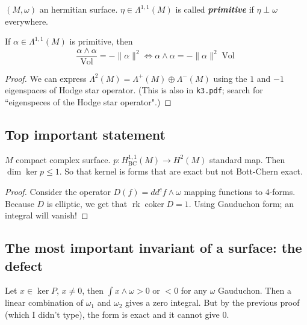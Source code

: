 \begin{defn}\leavevmode
\((M,\omega)\) an hermitian surface. \(\eta \in \Lambda^{1,1}(M)\) is called \textit{\textbf{primitive}} if \(\eta \perp \omega\) everywhere.
\end{defn}

\begin{thm}\leavevmode
If \(\alpha \in \Lambda^{1,1}(M)\) is primitive, then
 \[\frac{\alpha \wedge \alpha}{\operatorname{Vol}}=-\|\alpha\|^2 \iff \alpha \wedge \alpha=-\|\alpha\|^2\operatorname{Vol}\]
\end{thm}

\begin{proof}\leavevmode
We can express \(\Lambda^{2}(M)=\Lambda^{+}(M) \oplus \Lambda^{-}(M)\) using the \(1\) and \(-1\) eigenspaces of Hodge star operator. (This is also in \texttt{k3.pdf}; search for ``eigenspeces of the Hodge star operator".)
\end{proof}

\subsection{Top important statement}

\begin{thm}\leavevmode
\(M\) compact complex surface. \(p : H^{1,1}_{\operatorname{BC}}(M)\to H^{2}(M)\) standard map. Then \(\dim \ker p \leq 1\). So that kernel is forms that are exact but not Bott-Chern exact.
\end{thm}

\begin{proof}\leavevmode
	Consider the operator \(D(f)= d d^c f \wedge \omega\) mapping functions to 4-forms. Because \(D\) is elliptic, we get that \(\operatorname{rk} \operatorname{coker}D=1\). Using Gauduchon form; an integral will vanish!
\end{proof}

\subsection{The most important invariant of a surface: the defect}

\begin{coro}\leavevmode
Let \(x \in \ker P\), \(x \neq 0\), then \(\int x\wedge \omega>0\) or \(<0\) for any \(\omega\) Gauduchon. Then a linear combination of \(\omega_1\) and \(\omega_2\) gives a zero integral. But by the previous proof (which I didn't type), the form is exact and it cannot give 0.
\end{coro}

